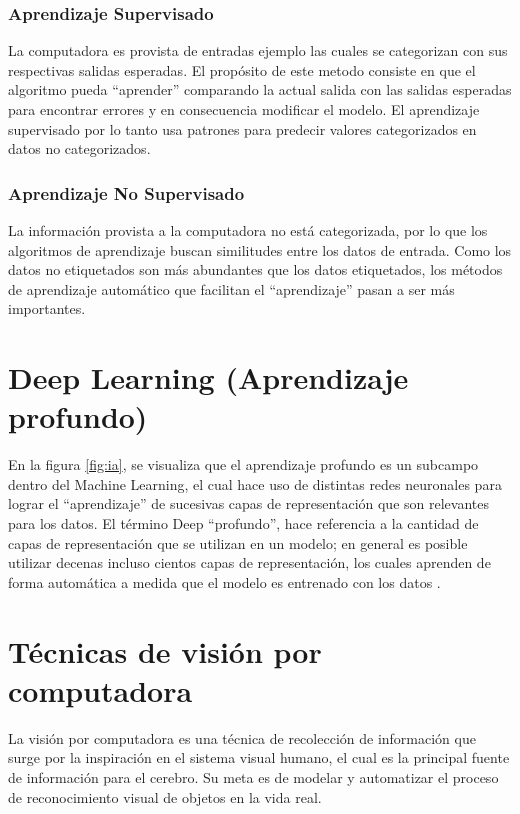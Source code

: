 \subsubsection{Aprendizaje Supervisado}
La computadora es provista de entradas ejemplo las cuales se categorizan con sus respectivas salidas esperadas. El propósito de este metodo consiste en que el algoritmo pueda  ``aprender'' comparando la actual salida con las salidas esperadas para encontrar errores y en consecuencia modificar el modelo. El aprendizaje supervisado por lo tanto usa patrones para predecir valores categorizados en datos no categorizados.\\

\subsubsection{Aprendizaje No Supervisado}
La información provista a la computadora no está categorizada, por lo que los algoritmos de aprendizaje buscan similitudes entre los datos de entrada. Como los datos no etiquetados son más abundantes que los datos etiquetados, los métodos de aprendizaje automático que facilitan el ``aprendizaje'' pasan a ser más importantes.\\

\section{Deep Learning (Aprendizaje profundo)}
En la figura \ref{fig:ia}, se visualiza que el aprendizaje profundo es un subcampo dentro del Machine Learning, el cual hace uso de distintas redes neuronales para lograr el ``aprendizaje'' de sucesivas capas de representación que son relevantes para los datos. El término Deep ``profundo'', hace referencia a la cantidad de capas de representación que se utilizan en un modelo; en general es posible utilizar decenas incluso cientos capas de representación, los cuales aprenden de forma automática a medida que el modelo es entrenado con los datos \cite{iaarbook:artificialvision}.

\section{Técnicas de visión por computadora}
La visión por computadora es una técnica de recolección de información que surge por la inspiración en el sistema visual humano, el cual es la principal fuente de información para el cerebro. Su meta es de modelar y automatizar el proceso de reconocimiento visual de objetos en la vida real.\\

